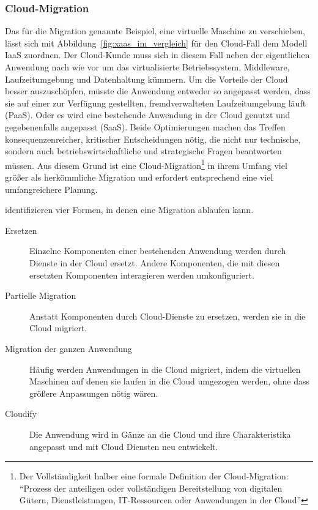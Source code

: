 \subsubsection{Cloud-Migration}
Das für die Migration genannte Beispiel, eine virtuelle Maschine zu
verschieben, lässt sich mit Abbildung~\ref{fig:xaas_im_vergleich} für den
Cloud-Fall dem Modell IaaS zuordnen. Der Cloud-Kunde muss sich in diesem Fall
neben der eigentlichen Anwendung nach wie vor um das virtualisierte
Betriebssystem, Middleware, Laufzeitumgebung und Datenhaltung kümmern. Um die
Vorteile der Cloud besser auszuschöpfen, müsste die Anwendung entweder so
angepasst werden, dass sie auf einer zur Verfügung gestellten, fremdverwalteten
Laufzeitumgebung läuft (PaaS). Oder es wird eine bestehende Anwendung in der
Cloud genutzt und gegebenenfalls angepasst (SaaS). Beide Optimierungen
machen das Treffen konsequenzenreicher, kritischer Entscheidungen nötig,
die nicht nur technische, sondern auch betriebswirtschaftliche und strategische
Fragen beantworten müssen. 
Aus diesem Grund ist eine Cloud-Migration\footnote{Der Vollständigkeit halber
eine formale Definition der Cloud-Migration: "`Prozess der anteiligen
oder
vollständigen Bereitstellung von digitalen Gütern, Dienstleistungen,
IT-Ressourcen oder Anwendungen in der Cloud"'}
 in ihrem Umfang viel größer als
herkömmliche Migration und erfordert entsprechend eine viel umfangreichere
Planung. 

 identifizieren vier Formen, in denen eine
Migration ablaufen kann.\label{cha:migrationsformen}
\begin{description}
	\item[Ersetzen] Einzelne Komponenten einer bestehenden Anwendung werden
durch Dienste in der Cloud ersetzt. Andere Komponenten, die mit diesen
ersetzten Komponenten interagieren werden umkonfiguriert.
	\item[Partielle Migration] Anstatt Komponenten durch Cloud-Dienste zu
ersetzen, werden sie in die Cloud migriert.
	\item[Migration der ganzen Anwendung] Häufig werden Anwendungen in die
Cloud migriert, indem die virtuellen Maschinen auf denen sie laufen in die
Cloud umgezogen werden, ohne dass größere Anpassungen nötig wären.
	\item[Cloudify] Die Anwendung wird in Gänze an die Cloud und ihre
Charakteristika angepasst und mit Cloud Diensten neu entwickelt.
\end{description}


